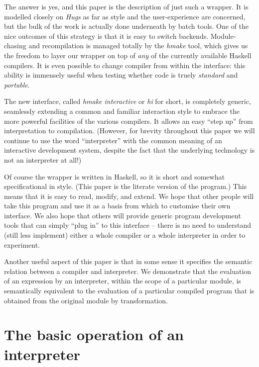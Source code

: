\documentclass[a4paper]{article}
\begin{document}
The answer is yes, and this paper is the description of just such
a wrapper.  It is modelled closely on {\em Hugs} as far as style
and the user-experience are concerned, but the bulk of the work is
actually done underneath by batch tools.  One of the nice outcomes of
this strategy is that it is easy to switch backends.  Module-chasing
and recompilation is managed totally by the {\em hmake} tool, which
gives us the freedom to layer our wrapper on top of {\em any} of the
currently available Haskell compilers.  It is even possible to change
compiler from within the interface: this ability is immensely useful
when testing whether code is truely {\em standard} and {\em portable}.

The new interface, called {\em hmake interactive} or {\em hi} for
short, is completely generic, seamlessly extending a common and
familiar interaction style to embrace the more powerful facilities
of the various compilers.  It allows an easy ``step up'' from
interpretation to compilation.  (However, for brevity throughout this
paper we will continue to use the word ``interpreter'' with the common
meaning of an interactive development system, despite the fact that
the underlying technology is not an interpreter at all!)

Of course the wrapper is written in Haskell, so it is short and
somewhat specificational in style.  (This paper is the literate
version of the program.)  This means that it is easy to read, modify,
and extend.  We hope that other people will take this program and
use it as a basis from which to customise their own interface.
We also hope that others will provide generic program development
tools that can simply ``plug in'' to this interface -- there is no need
to understand (still less implement) either a whole compiler or a
whole interpreter in order to experiment.

Another useful aspect of this paper is that in some sense it
specifies the semantic relation between a compiler and interpreter.
We demonstrate that the evaluation of an expression by an interpreter,
within the scope of a particular module, is semantically equivalent
to the evaluation of a particular compiled program that is obtained
from the original module by transformation.




\section{The basic operation of an interpreter}
\end{document}
